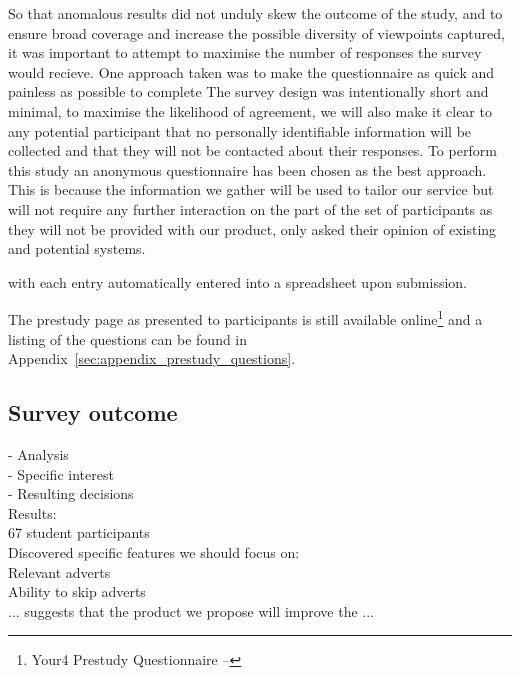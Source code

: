 So that anomalous results did not unduly skew the outcome of the study, and to ensure broad coverage and increase the possible diversity of viewpoints captured, it was important to attempt to maximise the number of responses the survey would recieve.
One approach taken was to make the questionnaire as quick and painless as possible to complete
The survey design was intentionally short and minimal, to maximise the likelihood of agreement, we will also make it clear to any potential participant that no personally identifiable information will be collected and that they will not be contacted about their responses. %
To perform this study an anonymous questionnaire has been chosen as the best approach.
This is because the information we gather will be used to tailor our service but will not require any further interaction on the part of the set of participants as they will not be provided with our product, only asked their opinion of existing and potential systems.

with each entry automatically entered into a spreadsheet upon submission.




The prestudy page as presented to participants is still available online\footnote{Your4 Prestudy Questionnaire -- } and a listing of the questions can be found in Appendix~\ref{sec:appendix_prestudy_questions}. 


\subsection{Survey outcome}



 - Analysis\\
  - Specific interest\\
  - Resulting decisions\\

Results:\\
67 student participants\\
Discovered specific features we should focus on:\\
Relevant adverts\\
Ability to skip adverts\\
... suggests that the product we propose will improve the ...

